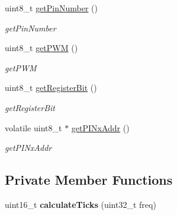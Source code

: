 \begin{DoxyCompactItemize}
uint8\+\_\+t \hyperlink{classPin_aaad2c2cc8ccda03ffe9c07e12323cf4d}{get\+Pin\+Number} ()
\begin{DoxyCompactList}\small\item\em get\+Pin\+Number \end{DoxyCompactList}\item 
uint8\+\_\+t \hyperlink{classPin_a5a9c1d0f1937b7083779ca4afba2a607}{get\+P\+WM} ()
\begin{DoxyCompactList}\small\item\em get\+P\+WM \end{DoxyCompactList}\item 
uint8\+\_\+t \hyperlink{classPin_af7d88df8c24769198ee8e022ce0ed0fd}{get\+Register\+Bit} ()
\begin{DoxyCompactList}\small\item\em get\+Register\+Bit \end{DoxyCompactList}\item 
volatile uint8\+\_\+t $\ast$ \hyperlink{classPin_ae2d4f832b081cd2d188151a0c4589f8d}{get\+P\+I\+Nx\+Addr} ()
\begin{DoxyCompactList}\small\item\em get\+P\+I\+Nx\+Addr \end{DoxyCompactList}\end{DoxyCompactItemize}
\subsection*{Private Member Functions}
\begin{DoxyCompactItemize}
\item 
\mbox{\label{classPin_a6a094c4d39ce02a525e77d1951001b53}} 
uint16\+\_\+t {\bfseries calculate\+Ticks} (uint32\+\_\+t freq)
\end{DoxyCompactItemize}

